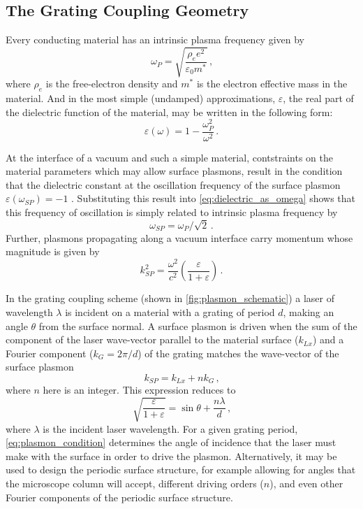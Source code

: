 \subsection{The Grating Coupling Geometry}

Every conducting material has an intrinsic plasma frequency given by 
\begin{equation}
  \omega_{P} = \sqrt{\frac{\rho_{e} e^2}{\varepsilon_{0} m^*}} \,\text{,}
\end{equation}
where $\rho_{e}$ is the free-electron density and $m^*$ is the electron effective mass in the material.
And in the most simple (undamped) approximations, $\varepsilon$, the real part of the dielectric function of the material, may be written in the following form:
\begin{equation} \label{eq:dielectric_as_omega}
  \varepsilon(\omega) = 1 - \frac{ \omega_{P}^2 }{ \omega^2 } \,\text{.}
\end{equation}

At the interface of a vacuum and such a simple material, contstraints on the material parameters which may allow surface plasmons, result in the condition that the dielectric constant at the oscillation frequency of the surface plasmon $ \varepsilon(\omega_{SP}) = -1 $ \cite{cottam_introduction_2004}.
Substituting this result into \ref{eq:dielectric_as_omega} shows that this frequency of oscillation is simply related to intrinsic plasma frequency by
\begin{equation}
  \omega_{SP} = \omega_{P} / \sqrt{2} \,\text{.}
\end{equation}
Further, plasmons propagating along a vacuum interface carry momentum whose magnitude is given by 
\begin{equation}
  k_{SP}^2 = \frac{\omega^2}{c^2} \left( \frac{ \varepsilon }{ 1 + \varepsilon } \right) \,\text{.}
\end{equation}

In the grating coupling scheme (shown in \ref{fig:plasmon_schematic}) a laser of wavelength $\lambda$ is incident on a material with a grating of period $d$, making an angle $\theta$ from the surface normal.
A surface plasmon is driven when the sum of the component of the laser wave-vector parallel to the material surface ($k_{Lx}$) and a Fourier component ($k_{G} = 2 \pi / d$) of the grating matches the wave-vector of the surface plasmon
\begin{equation}
  k_{SP} = k_{Lx} + n k_{G} \,\text{,}
\end{equation}
where $n$ here is an integer.
This expression reduces to 
\begin{equation} \label{eq:plasmon_condition}
  \sqrt{ \frac{ \varepsilon }{ 1 + \varepsilon } } = \sin \theta + \frac{ n \lambda }{ d } \,\text{,}
\end{equation}
where $\lambda$ is the incident laser wavelength.
For a given grating period, \ref{eq:plasmon_condition} determines the angle of incidence that the laser must make with the surface in order to drive the plasmon.
Alternatively, it may be used to design the periodic surface structure, for example allowing for angles that the microscope column will accept, different driving orders ($n$), and even other Fourier components of the periodic surface structure.

